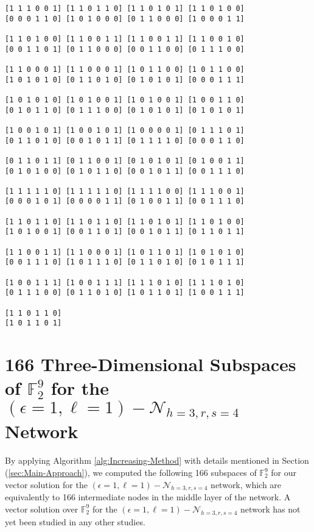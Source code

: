 \begin{lstlisting}
[1 1 1 0 0 1] [1 1 0 1 1 0] [1 1 0 1 0 1] [1 1 0 1 0 0] 
[0 0 0 1 1 0] [1 0 1 0 0 0] [0 1 1 0 0 0] [1 0 0 0 1 1] 

[1 1 0 1 0 0] [1 1 0 0 1 1] [1 1 0 0 1 1] [1 1 0 0 1 0] 
[0 0 1 1 0 1] [0 1 1 0 0 0] [0 0 1 1 0 0] [0 1 1 1 0 0] 

[1 1 0 0 0 1] [1 1 0 0 0 1] [1 0 1 1 0 0] [1 0 1 1 0 0] 
[1 0 1 0 1 0] [0 1 1 0 1 0] [0 1 0 1 0 1] [0 0 0 1 1 1] 

[1 0 1 0 1 0] [1 0 1 0 0 1] [1 0 1 0 0 1] [1 0 0 1 1 0] 
[0 1 0 1 1 0] [0 1 1 1 0 0] [0 1 0 1 0 1] [0 1 0 1 0 1] 

[1 0 0 1 0 1] [1 0 0 1 0 1] [1 0 0 0 0 1] [0 1 1 1 0 1] 
[0 1 1 0 1 0] [0 0 1 0 1 1] [0 1 1 1 1 0] [0 0 0 1 1 0] 

[0 1 1 0 1 1] [0 1 1 0 0 1] [0 1 0 1 0 1] [0 1 0 0 1 1] 
[0 1 0 1 0 0] [0 1 0 1 1 0] [0 0 1 0 1 1] [0 0 1 1 1 0] 

[1 1 1 1 1 0] [1 1 1 1 1 0] [1 1 1 1 0 0] [1 1 1 0 0 1] 
[0 0 0 1 0 1] [0 0 0 0 1 1] [0 1 0 0 1 1] [0 0 1 1 1 0] 

[1 1 0 1 1 0] [1 1 0 1 1 0] [1 1 0 1 0 1] [1 1 0 1 0 0] 
[1 0 1 0 0 1] [0 0 1 1 0 1] [0 0 1 0 1 1] [0 1 1 0 1 1] 

[1 1 0 0 1 1] [1 1 0 0 0 1] [1 0 1 1 0 1] [1 0 1 0 1 0] 
[0 0 1 1 1 0] [1 0 1 1 1 0] [0 1 1 0 1 0] [0 1 0 1 1 1] 

[1 0 0 1 1 1] [1 0 0 1 1 1] [1 1 1 0 1 0] [1 1 1 0 1 0] 
[0 1 1 1 0 0] [0 1 1 0 1 0] [1 0 1 1 0 1] [1 0 0 1 1 1] 

[1 1 0 1 1 0] 
[1 0 1 1 0 1]
\end{lstlisting}


\section{166 Three-Dimensional Subspaces of $\ensuremath{\mathbb{F}}_{2}^{9}$
for the $\left(\epsilon=1,\ell=1\right)-\mathcal{N}_{h=3,r,s=4}$
Network \label{sec:166-Three-Dimensional-Subspaces}}

By applying Algorithm \vref{alg:Increasing-Method} with details mentioned
in Section (\ref{sec:Main-Approach}), we computed the following 166
subspaces of $\ensuremath{\mathbb{F}}_{2}^{9}$ for our vector solution
for the $\left(\epsilon=1,\ell=1\right)-\mathcal{N}_{h=3,r,s=4}$
network, which are equivalently to 166 intermediate nodes in the middle
layer of the network. A vector solution over $\ensuremath{\mathbb{F}}_{2}^{9}$
for the $\left(\epsilon=1,\ell=1\right)-\mathcal{N}_{h=3,r,s=4}$
network has not yet been studied in any other studies.

